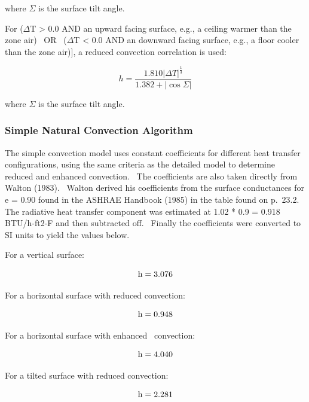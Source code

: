 where $\Sigma$ is the surface tilt angle.

For ($\Delta$T \textgreater{} 0.0 AND an upward facing surface, e.g., a ceiling warmer than the zone air)~ OR~ ($\Delta$T \textless{} 0.0 AND an downward facing surface, e.g., a floor cooler than the zone air)], a reduced convection correlation is used:

\begin{equation}
h = \frac{{1.810{{\left| {\Delta T} \right|}^{\frac{1}{3}}}}}{{1.382 + \left| {\cos \Sigma } \right|}}
\end{equation}

where $\Sigma$ is the surface tilt angle.

\subsubsection{Simple Natural Convection Algorithm}\label{simple-natural-convection-algorithm}

The simple convection model uses constant coefficients for different heat transfer configurations, using the same criteria as the detailed model to determine reduced and enhanced convection.~ The coefficients are also taken directly from Walton (1983).~ Walton derived his coefficients from the surface conductances for e = 0.90 found in the ASHRAE Handbook (1985) in the table found on p.~23.2.~ The radiative heat transfer component was estimated at 1.02 * 0.9 = 0.918 BTU/h-ft2-F and then subtracted off.~ Finally the coefficients were converted to SI units to yield the values below.

For a vertical surface:

\begin{equation}
{\rm{h  =  3}}{\rm{.076}}
\end{equation}

For a horizontal surface with reduced convection:

\begin{equation}
{\rm{h  =  0}}{\rm{.948}}
\end{equation}

For a horizontal surface with enhanced~ convection:

\begin{equation}
{\rm{h  =  4}}{\rm{.040}}
\end{equation}

For a tilted surface with reduced convection:

\begin{equation}
{\rm{h  =  2}}{\rm{.281}}
\end{equation}

